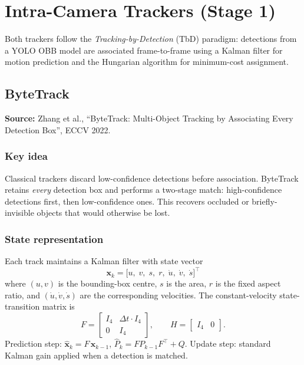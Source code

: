\documentclass[11pt,a4paper]{article}
\begin{document}
\section{Intra-Camera Trackers (Stage 1)}

Both trackers follow the \emph{Tracking-by-Detection} (TbD) paradigm:
detections from a YOLO OBB model are associated frame-to-frame using a
Kalman filter for motion prediction and the Hungarian algorithm for
minimum-cost assignment.

\subsection{ByteTrack}

\textbf{Source:} Zhang et al., ``ByteTrack: Multi-Object Tracking by Associating
Every Detection Box'', ECCV 2022.

\subsubsection*{Key idea}
Classical trackers discard low-confidence detections before association.
ByteTrack retains \emph{every} detection box and performs a two-stage match:
high-confidence detections first, then low-confidence ones.  This recovers
occluded or briefly-invisible objects that would otherwise be lost.

\subsubsection*{State representation}
Each track maintains a Kalman filter with state vector
\begin{equation}
  \mathbf{x}_k =
  \bigl[u,\; v,\; s,\; r,\; \dot{u},\; \dot{v},\; \dot{s}\bigr]^\top
  \label{eq:kalman-state}
\end{equation}
where $(u, v)$ is the bounding-box centre, $s$ is the area, $r$ is the
fixed aspect ratio, and $(\dot{u}, \dot{v}, \dot{s})$ are the corresponding
velocities.  The constant-velocity state-transition matrix is
\begin{equation}
  F = \begin{bmatrix} I_4 & \Delta t \cdot I_4 \\ 0 & I_4 \end{bmatrix},
  \qquad
  H = \begin{bmatrix} I_4 & 0 \end{bmatrix}.
\end{equation}
Prediction step: $\hat{\mathbf{x}}_k = F\,\mathbf{x}_{k-1}$,\;
$\hat{P}_k = F P_{k-1} F^\top + Q$.
Update step: standard Kalman gain applied when a detection is matched.
\end{document}
